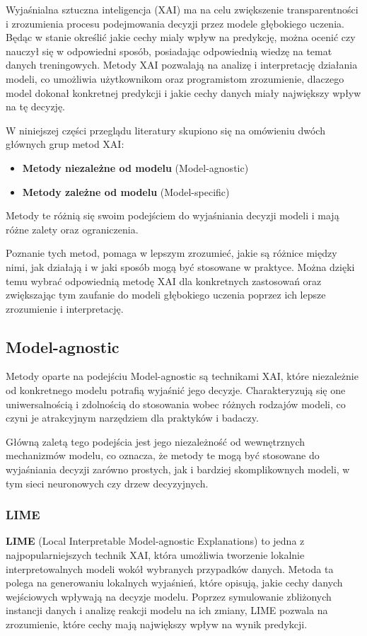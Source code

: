 Wyjaśnialna sztuczna inteligencja (XAI) ma na celu zwiększenie transparentności i zrozumienia procesu podejmowania decyzji przez modele głębokiego uczenia.
Będąc w stanie określić jakie cechy mialy wpływ na predykcję, można ocenić czy nauczył się w odpowiedni sposób, posiadając odpowiednią wiedzę na temat danych treningowych.
Metody XAI pozwalają na analizę i interpretację działania modeli, co umożliwia użytkownikom oraz programistom zrozumienie, dlaczego model dokonał konkretnej predykcji i jakie cechy danych miały największy wpływ na tę decyzję.

W niniejszej części przeglądu literatury skupiono się na omówieniu dwóch głównych grup metod XAI:
\begin{itemize}
	\item \textbf{Metody niezależne od modelu} (Model-agnostic)
	\item \textbf{Metody zależne od modelu} (Model-specific)
\end{itemize}
Metody te różnią się swoim podejściem do wyjaśniania decyzji modeli i mają różne zalety oraz ograniczenia.

Poznanie tych metod, pomaga w lepszym zrozumieć, jakie są różnice między nimi, jak działają i w jaki sposób mogą być stosowane w praktyce.
Można dzięki temu wybrać odpowiednią metodę XAI dla konkretnych zastosowań oraz zwiększając tym zaufanie do modeli głębokiego uczenia poprzez ich lepsze zrozumienie i interpretację.

\subsection*{Model-agnostic}
Metody oparte na podejściu Model-agnostic są technikami XAI, które niezależnie od konkretnego modelu potrafią wyjaśnić jego decyzje.
Charakteryzują się one uniwersalnością i zdolnością do stosowania wobec różnych rodzajów modeli, co czyni je atrakcyjnym narzędziem dla praktyków i badaczy.

Główną zaletą tego podejścia jest jego niezależność od wewnętrznych mechanizmów modelu, co oznacza, że metody te mogą być stosowane do wyjaśniania decyzji zarówno prostych, jak i bardziej skomplikownych modeli, w tym sieci neuronowych czy drzew decyzyjnych.

\subsubsection*{LIME}
\textbf{LIME} (Local Interpretable Model-agnostic Explanations) to jedna z najpopularniejszych technik XAI, która umożliwia tworzenie lokalnie interpretowalnych modeli wokół wybranych przypadków danych.
Metoda ta polega na generowaniu lokalnych wyjaśnień, które opisują, jakie cechy danych wejściowych wpływają na decyzje modelu.
Poprzez symulowanie zbliżonych instancji danych i analizę reakcji modelu na ich zmiany, LIME pozwala na zrozumienie, które cechy mają największy wpływ na wynik predykcji.



